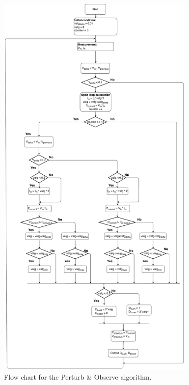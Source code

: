 \begin{figure}[H]
	\begin{center}
		\includegraphics[width=0.87\textwidth]{../Pictures/P1/Flow_chart/2018_12_17Flow_chart_MPPT_Buck_Boost_converter.pdf}
		\caption{Flow chart for the Perturb \& Observe algorithm.}
		\label{fcfinal} 
	\end{center}	
\end{figure}

